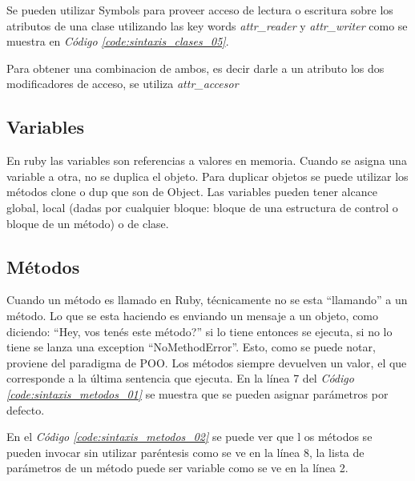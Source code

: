 \documentclass{article}
\newcommand{\refcode}[1]{\textit{Código \ref{#1}}}
\begin{document}
Se pueden utilizar Symbols para proveer acceso de lectura o escritura sobre los atributos de una clase utilizando las key words \textit{attr\_reader} y \textit{attr\_writer} como se muestra en \refcode{code:sintaxis_clases_05}.   

 
\bigskip

Para obtener una combinacion de ambos, es decir darle a un atributo los dos modificadores de acceso, se utiliza \textit{attr\_accesor}
\bigskip



\subsection{Variables}
En ruby las variables son referencias a valores en memoria. Cuando se asigna una variable a otra, no se duplica el objeto. Para duplicar objetos se puede utilizar los métodos clone o dup que son de Object.
Las variables pueden tener alcance global, local (dadas por cualquier bloque: bloque de una estructura de control o bloque de un método) o de clase.

 
\bigskip



\subsection{Métodos}

Cuando un método es llamado en Ruby, técnicamente no se esta “llamando” a un método. Lo que se esta haciendo es enviando un mensaje a un objeto, como diciendo: “Hey, vos tenés este método?” si lo tiene entonces se ejecuta, si no lo tiene se lanza una exception “NoMethodError”. Esto, como se puede notar, proviene del paradigma de POO.
Los métodos siempre devuelven un valor, el que corresponde a la última sentencia que ejecuta. 
En la línea 7 del \refcode{code:sintaxis_metodos_01} se muestra que se pueden asignar parámetros por defecto.
 

En el \refcode{code:sintaxis_metodos_02} se puede ver que l os métodos se pueden invocar sin utilizar paréntesis como se ve en la línea 8, la lista de parámetros de un método puede ser variable como se ve en la línea 2.
 
\end{document}
